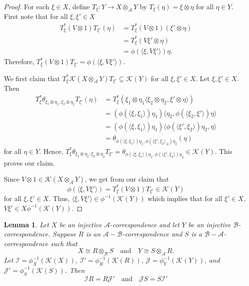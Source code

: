 \documentclass[11pt, letterpaper,final]{amsart}
\newcommand{\A}{{\mathcal{A}}}
\newcommand{\B}{{\mathcal{B}}}
\newcommand{\I}{{\mathcal{I}}}
\newcommand{\J}{{\mathcal{J}}}
\newcommand{\K}{{\mathcal{K}}}
\newtheorem{lem}[thm]{Lemma}
\theoremstyle{definition}
\begin{document}
\begin{proof}
For each $\xi \in X$, define $T_{\xi} \colon Y \to X \otimes_{\A} Y$ by $T_{\xi}(\eta) = \xi \otimes \eta$ for all $\eta \in Y$.  First note that for all $\xi, \xi' \in X$
\begin{align*}
    T_{\xi}^* (V \otimes 1 ) T_{\xi'} (\eta) &= T_{\xi}^* (V \otimes 1)(\xi' \otimes \eta) \\
    &= T_{\xi}^* ( V\xi' \otimes \eta) \\
    &= \phi ( \langle \xi, V\xi' \rangle ) \eta.
\end{align*}
Therefore, $T_{\xi}^* (V \otimes 1 ) T_{\xi'}= \phi ( \langle \xi, V\xi' \rangle )$.  

We first claim that $T_{\xi}^* \K( X \otimes_{\A} Y) T_{\xi'} \subseteq \K(Y)$ for all $\xi, \xi' \in X$.  Let $\xi, \xi' \in X$.  Then
\begin{align*}
    T_{\xi}^* \theta_{ \xi_1 \otimes \eta_1, \xi_2 \otimes \eta_2} T_{\xi'} ( \eta) &= T_{\xi}^* ( \xi_1 \otimes \eta_1 \langle \xi_2 \otimes \eta_2 , \xi' \otimes \eta \rangle) \\
    &= (\phi(\langle \xi, \xi_1 \rangle)\eta_1 ) \langle \eta_2, \phi(\langle \xi_2, \xi' \rangle) \eta \rangle \\
    &= (\phi(\langle \xi, \xi_1 \rangle )\eta_1 ) \langle \phi ( \langle \xi' , \xi_2 \rangle ) \eta_2, \eta \rangle \\
    &= \theta_{\phi(\langle \xi, \xi_1 \rangle )\eta_1 , \phi ( \langle \xi' , \xi_2 \rangle_A ) \eta_2 }(\eta)
\end{align*}
for all $\eta \in Y$.  Hence, $T_{\xi}^* \theta_{ \xi_1 \otimes \eta_1, \xi_2 \otimes \eta_2} T_{\xi'}=\theta_{\phi(\langle \xi, \xi_1 \rangle )\eta_1 , \phi ( \langle \xi' , \xi_2 \rangle ) \eta_2 } \in \K(Y)$.  This proves our claim.

Since $V \otimes 1 \in \K(X \otimes_\A Y)$, we get from our claim that
$$
\phi ( \langle \xi, V\xi' \rangle )=T_{\xi}^* (V \otimes 1 ) T_{\xi'} \in \K(Y)
$$
for all $\xi,\xi' \in X$. Thus, $\langle \xi , V\xi' \rangle \in \phi^{-1}(\K(Y))$ which implies that for all $\xi' \in X$, $V\xi' \in X \phi^{-1}(\K(Y))$.
\end{proof}

\begin{lem} \label{l:invariant-ideal}
Let $X$ be an injective $\A$-correspondence and let $Y$ be an injective $\B$-correspondence. Suppose $R$ is an $\A-\B$-correspondence and $S$ is a $\B-\A$-correspondence such that 
$$
X \cong R \otimes_{\B} S \quad \text{and} \quad Y \cong S \otimes_{\A} R.
$$
Let $\I = \phi_X^{-1}(\K(X))$, $\I' = \phi_R^{-1}(\K(R))$, $\J = \phi_Y^{-1}(\K(Y))$, and $\J' = \phi_S^{-1} (\K(S))$.  Then 
$$
\I R = R\J' \quad \text{and} \quad \J S = S\I'
$$
\end{lem}
\end{document}
